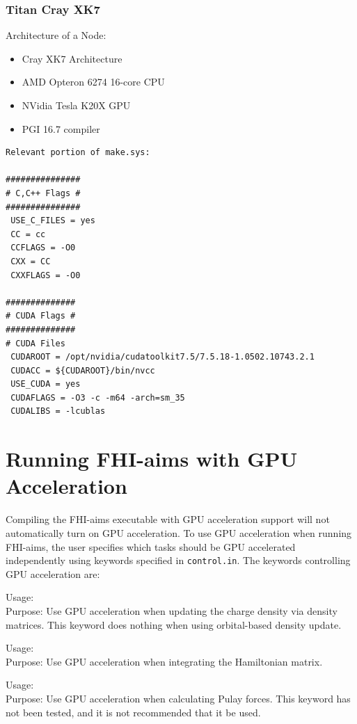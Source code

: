 \subsubsection{Titan Cray XK7}

Architecture of a Node:
\begin{itemize}
	\item Cray XK7 Architecture
	\item AMD Opteron 6274 16-core CPU
	\item NVidia Tesla K20X GPU
	\item PGI 16.7 compiler
\end{itemize}

\begin{verbatim}
Relevant portion of make.sys:

###############
# C,C++ Flags #
###############
 USE_C_FILES = yes
 CC = cc
 CCFLAGS = -O0
 CXX = CC
 CXXFLAGS = -O0

##############    
# CUDA Flags #
##############
# CUDA Files
 CUDAROOT = /opt/nvidia/cudatoolkit7.5/7.5.18-1.0502.10743.2.1
 CUDACC = ${CUDAROOT}/bin/nvcc
 USE_CUDA = yes 
 CUDAFLAGS = -O3 -c -m64 -arch=sm_35
 CUDALIBS = -lcublas
\end{verbatim}

\section{Running FHI-aims with GPU Acceleration}
Compiling the FHI-aims executable with GPU acceleration support will not automatically turn on GPU acceleration.  To use GPU acceleration when running FHI-aims, the user specifies which tasks should be GPU accelerated independently using keywords specified in \texttt{control.in}.  The keywords controlling GPU acceleration are:

{
  \noindent
  Usage:  \\[1.0ex]
  Purpose: Use GPU acceleration when updating the charge density via density matrices.  This keyword does nothing when using orbital-based density update.  \\[1.0ex] 
}


{
  \noindent
  Usage:  \\[1.0ex]
  Purpose: Use GPU acceleration when integrating the Hamiltonian matrix.  \\[1.0ex] 
}

{
  \noindent
  Usage:  \\[1.0ex]
  Purpose: Use GPU acceleration when calculating Pulay forces.  This keyword has not been tested, and it is not recommended that it be used.  \\[1.0ex] 
}

